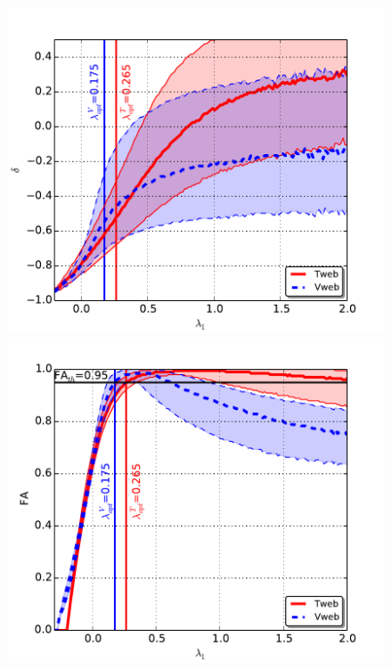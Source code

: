 \documentclass[a4,useAMS,usenatbib,usegraphicx]{mn2e}
\begin{document}
\begin{figure}
\centering

  \includegraphics[trim = 2mm 2mm 5mm 10mm, clip, keepaspectratio=true,
  width=0.35\textheight]{delta_L1.pdf}  
  \includegraphics[trim = 2mm 2mm 5mm 10mm, clip, keepaspectratio=true,
  width=0.35\textheight]{FA_L1.pdf}


\end{figure}
\end{document}
